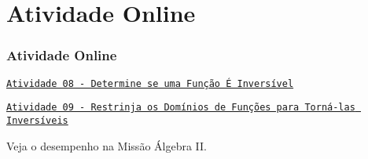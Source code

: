
\section{Atividade Online}
\begin{frame}
\frametitle{Atividade Online} 

\href{https://pt.khanacademy.org/math/algebra2/manipulating-functions/invertible-functions/e/inverse-domain-range}
{{\tt Atividade 08 - Determine se uma Função É Inversível}}

\href{https://pt.khanacademy.org/math/algebra2/manipulating-functions/invertible-functions/e/restrict-the-domains-of-functions}
{{\tt Atividade 09 - Restrinja os Domínios de Funções para Torná-las
Inversíveis}}


Veja o desempenho na Missão Álgebra II.
\end{frame}

